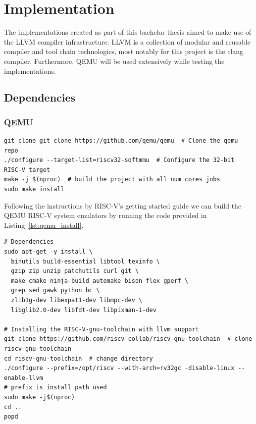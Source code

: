 \section{Implementation}
The implementations created as part of this bachelor thesis aimed to make use of
the LLVM compiler infrastructure. LLVM is a collection of modular and reusable
compiler and tool chain technologies, most notably for this project is the clang
compiler. Furthermore, QEMU will be used extensively while testing the
implementations.

\subsection{Dependencies}
\subsubsection*{QEMU}
\begin{lstlisting}[caption=Installing QEMU, float=*, label=lst:qemu_install]
git clone git clone https://github.com/qemu/qemu  # Clone the qemu repo
./configure --target-list=riscv32-softmmu  # Configure the 32-bit RISC-V target
make -j $(nproc)  # build the project with all num cores jobs
sudo make install
\end{lstlisting}
Following the instructions by RISC-V's getting started guide
we can build the QEMU RISC-V system emulators by running the code
provided in Listing~\ref{lst:qemu_install}\cite{RISC-V_GS}.
\begin{lstlisting}[caption=Installing LLVM compiler infastructure with RISC-V
32-bit as native target., float=*, label=lst:llvm_install]
# Dependencies
sudo apt-get -y install \
  binutils build-essential libtool texinfo \
  gzip zip unzip patchutils curl git \
  make cmake ninja-build automake bison flex gperf \
  grep sed gawk python bc \
  zlib1g-dev libexpat1-dev libmpc-dev \
  libglib2.0-dev libfdt-dev libpixman-1-dev

# Installing the RISC-V-gnu-toolchain with llvm support
git clone https://github.com/riscv-collab/riscv-gnu-toolchain  # clone
riscv-gnu-toolchain
cd riscv-gnu-toolchain  # change directory
./configure --prefix=/opt/riscv --with-arch=rv32gc -disable-linux --enable-llvm
# prefix is install path used
sudo make -j$(nproc)
cd ..
popd
\end{lstlisting}

